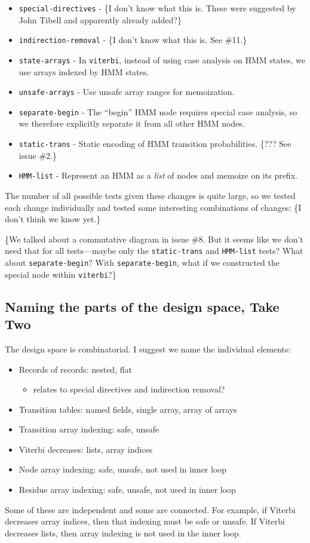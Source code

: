 \begin{itemize}
\item
  \texttt{special-directives} - \{I don't know what this is. These were
  suggested by John Tibell and apparently already added?\}
\item
  \texttt{indirection-removal} - \{I don't know what this is. See
  \#11.\}
\item
  \texttt{state-arrays} - In \texttt{viterbi}, instead of using case
  analysis on HMM states, we use arrays indexed by HMM states.
\item
  \texttt{unsafe-arrays} - Use unsafe array ranges for memoization.
\item
  \texttt{separate-begin} - The ``begin'' HMM node requires special case
  analysis, so we therefore explicitly separate it from all other HMM
  nodes.
\item
  \texttt{static-trans} - Static encoding of HMM transition
  probabilities. \{??? See issue \#2.\}
\item
  \texttt{HMM-list} - Represent an HMM as a \emph{list} of nodes and
  memoize on its prefix.
\end{itemize}

The number of all possible tests given these changes is quite large, so
we tested each change individually and tested some interesting
combinations of changes: \{I don't think we know yet.\}

\{We talked about a commutative diagram in issue \#8. But it seems like
we don't need that for all tests---maybe only the \texttt{static-trans}
and \texttt{HMM-list} tests? What about \texttt{separate-begin}? With
\texttt{separate-begin}, what if we constructed the special node within
\texttt{viterbi}?\}

\subsection{Naming the parts of the design space, Take Two}

The design space is combinatorial. I suggest we name the individual
elements:

\begin{itemize}
\item
  Records of records: nested, flat

  \begin{itemize}
  \item
    relates to special directives and indirection removal?
  \end{itemize}
\item
  Transition tables: named fields, single array, array of arrays
\item
  Transition array indexing: safe, unsafe
\item
  Viterbi decreases: lists, array indices
\item
  Node array indexing: safe, unsafe, not used in inner loop
\item
  Residue array indexing: safe, unsafe, not used in inner loop
\end{itemize}

Some of these are independent and some are connected. For example, if
Viterbi decreases array indices, then that indexing must be safe or
unsafe. If Viterbi decreases lists, then array indexing is not used in
the inner loop.
